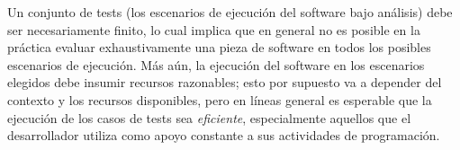 

Un conjunto de tests (los escenarios de ejecuci\'on del software bajo an\'alisis) debe ser necesariamente finito, lo cual implica que en general no es posible en la pr\'actica evaluar exhaustivamente una pieza de software en todos los posibles escenarios de ejecuci\'on. M\'as a\'un, la ejecuci\'on del software en los escenarios elegidos debe insumir recursos razonables; esto por supuesto va a depender del contexto y los recursos disponibles, pero en l\'ineas general es esperable que la ejecuci\'on de los casos de tests sea \emph{eficiente}, especialmente aquellos que el desarrollador utiliza como apoyo constante a sus actividades de programaci\'on. 



